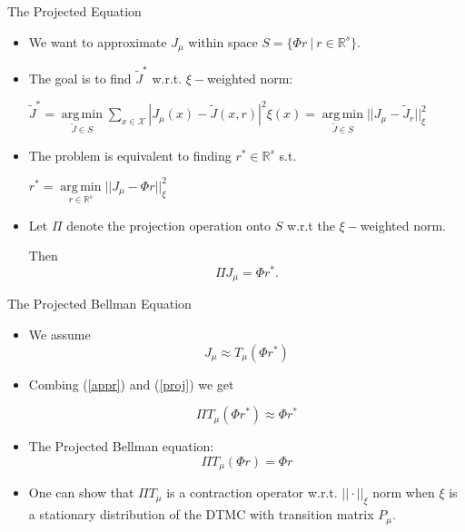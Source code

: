 \documentclass{beamer}
\def\R{{\mathbb R}}
\def\X{{\mathcal X}}
\DeclareMathOperator*{\argmin}{arg\,min}
\begin{document}
\begin{frame}{The Projected  Equation}

\begin{itemize}



\item We want to approximate $J_\mu$ within space $S = \{\Phi r~|~r\in \R^s\}$.


 
 
  \item The goal is to find $\tilde J^*$ w.r.t.  $\xi-$weighted norm:
  
\begin{center}
  $\tilde J^* = \argmin\limits_{\tilde J\in S} \sum\limits_{x\in \X} |J_\mu(x)-\tilde J(x, r)|^2\xi(x) =\argmin\limits_{\tilde J\in S} ||J_\mu-\tilde J_r||_\xi^2
  $
\end{center}
  
  \item The problem is equivalent to finding $r^*\in \R^s$ s.t.
  \begin{center}
  $r^* = \argmin\limits_{r\in \R^s} ||J_\mu-\Phi r||_\xi^2
  $
\end{center}
   \item Let $\Pi$ denote the projection operation onto $S$ w.r.t the $\xi-$weighted norm. 
   
   Then \begin{equation}\label{proj}\Pi J_\mu = \Phi r^*.\end{equation}
 
\end{itemize}

\end{frame}

\begin{frame}{The Projected Bellman Equation}



\begin{itemize}
\item We assume \begin{equation}\label{appr} J_\mu\approx T_\mu(\Phi r^*) \end{equation}

\item Combing (\ref{appr}) and (\ref{proj}) we get

\begin{equation*}
\Pi  T_\mu(\Phi r^*)\approx \Phi r^*
\end{equation*}

\item The Projected Bellman equation:
\begin{equation}\label{pbe}
\Pi  T_\mu(\Phi r)= \Phi r
\end{equation}


\item One can show that $\Pi T_\mu$ is a contraction operator w.r.t. $||\cdot||_\xi$ norm when $\xi$ is a stationary distribution of the DTMC with transition matrix $P_\mu.$
\end{itemize}\end{frame}
\end{document}
